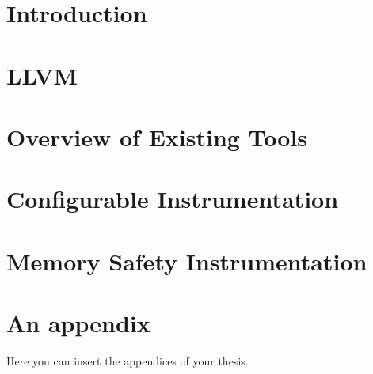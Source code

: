 \documentclass[
  digital, %
  table,   %
  lof,     %
  lot,     %
  nocoveri
]{fithesis3}
\begin{document}
\chapter{Introduction}


  \makeatletter\thesis@blocks@clear\makeatother
  \printindex


\chapter{LLVM}\label{chap:llvm}


\chapter{Overview of Existing Tools}\label{chap:tools}


\chapter{Configurable Instrumentation}\label{chap:instr}


\chapter{Memory Safety Instrumentation}\label{chap:memsafety}


\appendix %
\chapter{An appendix}
Here you can insert the appendices of your thesis.
\end{document}
